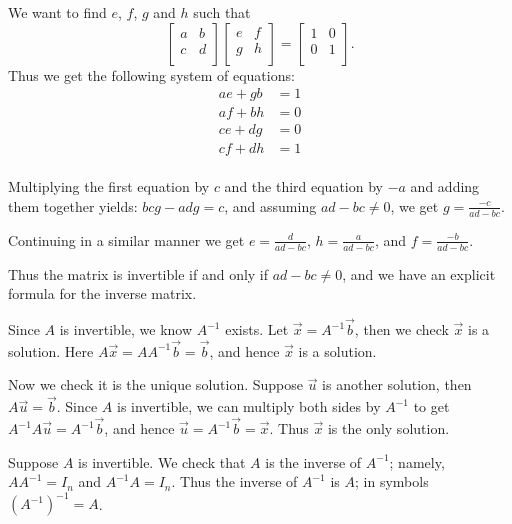 \documentclass[12pt,letterpaper]{article}
\begin{document}
\newpage
{}%
\lhead{}
\rhead{}
\thispagestyle{fancy}

\begin{enumerate}
\Answer We want to find $e$, $f$, $g$ and $h$ such that 
$$\begin{bmatrix}
a & b\\
c & d\\
\end{bmatrix}\begin{bmatrix}
e & f\\
g &h\\
\end{bmatrix}=\begin{bmatrix}
1 & 0\\
0 & 1\\
\end{bmatrix}.$$
Thus we get the following system of equations:
\begin{align*}
	ae+gb&=1\\
	af+bh&=0\\
	ce+dg&=0\\
	cf+dh&=1\\
\end{align*}

Multiplying the first equation by $c$ and the third equation by $-a$ and adding them together yields: $bcg-adg=c$, and assuming $ad-bc\neq0$, we get $g=\frac{-c}{ad-bc}$.

Continuing in a similar manner we get $e=\frac{d}{ad-bc}$, $h=\frac{a}{ad-bc}$, and $f=\frac{-b}{ad-bc}$.

Thus the matrix is invertible if and only if $ad-bc\neq0$, and we have an explicit formula for the inverse matrix.

\Answer Since $A$ is invertible, we know $A^{-1}$ exists. Let $\vec{x}=A^{-1}\vec{b}$, then we check $\vec{x}$ is a solution. Here $A\vec{x}=AA^{-1}\vec{b}=\vec{b}$, and hence $\vec{x}$ is a solution.

Now we check it is the unique solution. Suppose $\vec{u}$ is another solution, then $A\vec{u}=\vec{b}$. Since $A$ is invertible, we can multiply both sides by $A^{-1}$ to get $A^{-1}A\vec{u}=A^{-1}\vec{b}$, and hence $\vec{u}=A^{-1}\vec{b}=\vec{x}$. Thus $\vec{x}$ is the only solution.

\Answer 

\begin{enumerate}
	
	\Part Suppose $A$ is invertible. We check that $A$ is the inverse of $A^{-1}$; namely, $AA^{-1}=I_n$ and $A^{-1}A=I_n$. Thus the inverse of $A^{-1}$ is $A$; in symbols $(A^{-1})^{-1}=A$.
	

\end{enumerate}
\end{enumerate}
\end{document}
